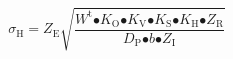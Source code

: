 \[{\sigma }_{\mathrm{H}}\mathrm{=}Z_{\mathrm{E}}\sqrt{\frac{W^{\mathrm{t}}{\mathrm{\bullet }K}_{\mathrm{O}}{\mathrm{\bullet }K}_{\mathrm{V}}\mathrm{\bullet }K_{\mathrm{S}}\mathrm{\bullet }K_{\mathrm{H}}\mathrm{\bullet }Z_{\mathrm{R}}}{D_{\mathrm{P}}\mathrm{\bullet }b\mathrm{\bullet }Z_{\mathrm{I}}}}\] 